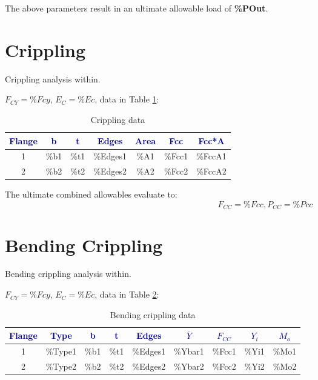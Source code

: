 \documentclass[11pt]{article}
\begin{document}
The above parameters result in an ultimate allowable load of \textbf{{\%POut}}.
\clearpage
\section{Crippling}

Crippling analysis within.

$F_{CY}={\%Fcy}$, $E_C={\%Ec}$, data in Table \ref{tab:crip1}:

\begin{table}[h]
    \centering
    \begin{tabular}{ccccccc}
        \textcolor{darkblue}{\textbf{Flange}} & \textcolor{darkblue}{\textbf{b}} & \textcolor{darkblue}{\textbf{t}} & \textcolor{darkblue}{\textbf{Edges}} & \textcolor{darkblue}{\textbf{Area}} & \textcolor{darkblue}{\textbf{Fcc}} & \textcolor{darkblue}{\textbf{Fcc*A}}\\\hline
        1 & {\%b1} & {\%t1} & {\%Edges1} & {\%A1} & {\%Fcc1} & {\%FccA1}\\
        2 & {\%b2} & {\%t2} & {\%Edges2} & {\%A2} & {\%Fcc2} & {\%FccA2}\\
    \end{tabular}
	\caption{Crippling data}
	\label{tab:crip1}
\end{table}

The ultimate combined allowables evaluate to: \[F_{CC}={\%Fcc}, P_{CC}={\%Pcc}\]
\clearpage
\section{Bending Crippling}

Bending crippling analysis within.

$F_{CY}={\%Fcy}$, $E_C={\%Ec}$, data in Table \ref{tab:bCrip1}:

\begin{table}[h]
    \centering
    \begin{tabular}{ccccccccc}
        \textcolor{darkblue}{\textbf{Flange}} & \textcolor{darkblue}{\textbf{Type}} & \textcolor{darkblue}{\textbf{b}} & \textcolor{darkblue}{\textbf{t}} & \textcolor{darkblue}{\textbf{Edges}} & \textcolor{darkblue}{\textbf{$\overline{Y}$}} & \textcolor{darkblue}{\textbf{$F_{CC}$}} & \textcolor{darkblue}{\textbf{$Y_i$}} & \textcolor{darkblue}{\textbf{$M_o$}}\\\hline
        1 & {\%Type1} & {\%b1} & {\%t1} & {\%Edges1} & {\%Ybar1} & {\%Fcc1} & {\%Yi1} & {\%Mo1}\\
        2 & {\%Type2} & {\%b2} & {\%t2} & {\%Edges2} & {\%Ybar2} & {\%Fcc2} & {\%Yi2} & {\%Mo2}\\
    \end{tabular}
	\caption{Bending crippling data}
	\label{tab:bCrip1}
\end{table}
\end{document}
